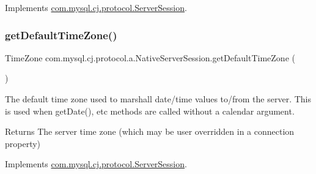 Implements \mbox{\hyperlink{interfacecom_1_1mysql_1_1cj_1_1protocol_1_1_server_session_aee37dfcad7c37e0b031da85b7f638435}{com.\+mysql.\+cj.\+protocol.\+Server\+Session}}.

\mbox{\label{classcom_1_1mysql_1_1cj_1_1protocol_1_1a_1_1_native_server_session_abba6aad0abd51609f134af9fa2cd345f}} 
\subsubsection{\texorpdfstring{get\+Default\+Time\+Zone()}{getDefaultTimeZone()}}
{\footnotesize\ttfamily Time\+Zone com.\+mysql.\+cj.\+protocol.\+a.\+Native\+Server\+Session.\+get\+Default\+Time\+Zone (\begin{DoxyParamCaption}{ }\end{DoxyParamCaption})}

The default time zone used to marshall date/time values to/from the server. This is used when get\+Date(), etc methods are called without a calendar argument.

\begin{DoxyReturn}{Returns}
The server time zone (which may be user overridden in a connection property) 
\end{DoxyReturn}


Implements \mbox{\hyperlink{interfacecom_1_1mysql_1_1cj_1_1protocol_1_1_server_session_a080efb1043278f9c6d13f7dc24d18476}{com.\+mysql.\+cj.\+protocol.\+Server\+Session}}.

\mbox{\label{classcom_1_1mysql_1_1cj_1_1protocol_1_1a_1_1_native_server_session_a3a9d807f5e66892f234d06934d275de1}} 
